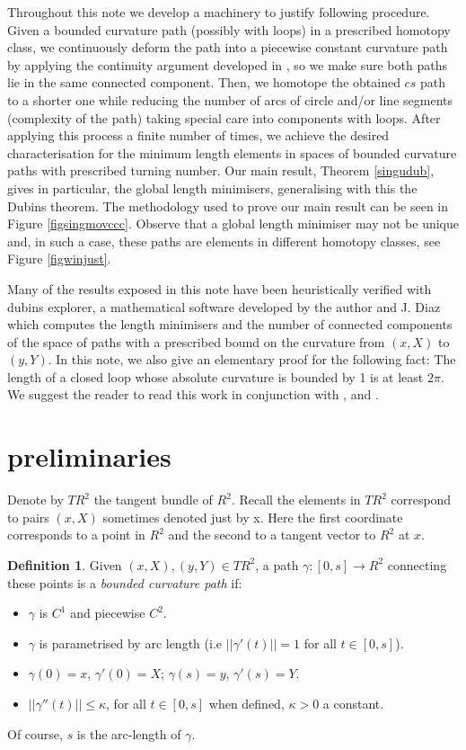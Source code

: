 \documentclass{amsart}
\theoremstyle{definition}
\newtheorem{definition}[theorem]{Definition}
\theoremstyle{remark}
\numberwithin{equation}{section}
\begin{document}
Throughout this note we develop a machinery to justify following procedure. Given a bounded curvature path (possibly with loops) in a prescribed homotopy class, we continuously deform the path into a piecewise constant curvature path by applying the continuity argument developed in \cite{paperd}, so we make sure both paths lie in the same connected component. Then, we homotope the obtained $cs$ path to a shorter one while reducing the number of arcs of circle and/or line segments (complexity of the path) taking special care into components with loops. After applying this process a finite number of times, we achieve the desired characterisation for the minimum length elements in spaces of bounded curvature paths with prescribed {turning number}. Our main result, Theorem \ref{singudub}, gives in particular, the global length minimisers, generalising with this the Dubins theorem. The methodology used to prove our main result can be seen in Figure \ref{figsingmovccc}. Observe that a global length minimiser may not be unique and, in such a case, these paths are elements in different homotopy classes, see Figure \ref{figwinjust}. 

Many of the results exposed in this note have been heuristically verified with {\sc dubins explorer}, a mathematical software developed by the author and J. Diaz which computes the length minimisers and the number of connected components of the space of paths with a prescribed bound on the curvature from $(x,X)$ to $(y,Y)$. In this note, we also give an elementary proof for the following fact: The length of a closed loop whose absolute curvature is bounded by 1 is at least $2\pi$. We suggest the reader to read this work in conjunction with \cite{papera}, \cite{paperd} and \cite{paperc}. 

\section{preliminaries}
Denote by $T{ R}^2$ the tangent bundle of ${ R}^2$. Recall the elements in $T{ R}^2$ correspond to pairs $(x,X)$ sometimes denoted just by {\sc x}. Here the first coordinate corresponds to a point in ${ R}^2$ and the second to a tangent vector to ${ R}^2$ at $x$.

\begin{definition} \label{adm_pat} Given $(x,X),(y,Y) \in T{ R}^2$,  a path $\gamma: [0,s]\rightarrow { R}^2$ connecting these points is a {\it bounded curvature path} if:
\end{definition}
 \begin{itemize}
\item $\gamma$ is $C^1$ and piecewise $C^2$.
\item $\gamma$ is parametrised by arc length (i.e $||\gamma'(t)||=1$ for all $t\in [0,s]$).
\item $\gamma(0)=x$,  $\gamma'(0)=X$;  $\gamma(s)=y$,  $\gamma'(s)=Y.$
\item $||\gamma''(t)||\leq \kappa$, for all $t\in [0,s]$ when defined, $\kappa>0$ a constant.
\end{itemize}
Of course, $s$ is the arc-length of $\gamma$.
\end{document}

